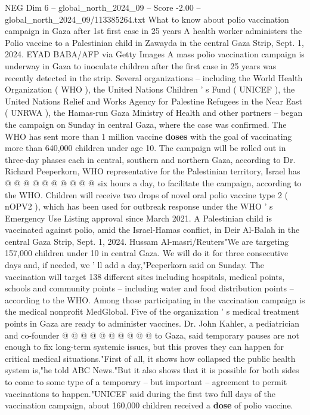 \begin{textsample}{NEG Dim 6 – global\_north\_2024\_09 – Score -2.00 – global\_north\_2024\_09/113385264.txt}  \label{ex:f6_neg_016}
What to know about polio vaccination campaign in Gaza after 1st first case in 25 years A health worker administers the Polio vaccine to a Palestinian child in Zawayda in the central Gaza Strip, Sept. 1, 2024.
EYAD BABA/AFP via Getty Images A mass polio vaccination campaign is underway in Gaza to inoculate children after the first case in 25 years was recently detected in the strip.
Several organizations -- including the World Health Organization ( WHO ), the United Nations Children ' s Fund ( UNICEF ), the United Nations Relief and Works Agency for Palestine Refugees in the Near East ( UNRWA ), the Hamas-run Gaza Ministry of Health and other partners -- began the campaign on Sunday in central Gaza, where the case was confirmed.
The WHO has sent more than 1 million vaccine \textbf{doses} with the goal of vaccinating more than 640,000 children under age 10.
The campaign will be rolled out in three-day phases each in central, southern and northern Gaza, according to Dr.
Richard Peeperkorn, WHO representative for the Palestinian territory, Israel has @ @ @ @ @ @ @ @ @ @ six hours a day, to facilitate the campaign, according to the WHO.
Children will receive two drops of novel oral polio vaccine type 2 ( nOPV2 ), which has been used for outbreak response under the WHO ' s Emergency Use Listing approval since March 2021.
A Palestinian child is vaccinated against polio, amid the Israel-Hamas conflict, in Deir Al-Balah in the central Gaza Strip, Sept. 1, 2024.
Hussam Al-masri/Reuters"We are targeting 157,000 children under 10 in central Gaza.
We will do it for three consecutive days and, if needed, we ' ll add a day,"Peeperkorn said on Sunday.
The vaccination will target 138 different sites including hospitals, medical points, schools and community points -- including water and food distribution points -- according to the WHO.
Among those participating in the vaccination campaign is the medical nonprofit MedGlobal.
Five of the organization ' s medical treatment points in Gaza are ready to administer vaccines.
Dr.
John Kahler, a pediatrician and co-founder @ @ @ @ @ @ @ @ @ @ to Gaza, said temporary pauses are not enough to fix long-term systemic issues, but this proves they can happen for critical medical situations."First of all, it shows how collapsed the public health system is,"he told ABC News."But it also shows that it is possible for both sides to come to some type of a temporary -- but important -- agreement to permit vaccinations to happen."UNICEF said during the first two full days of the vaccination campaign, about 160,000 children received a \textbf{dose} of polio vaccine.

\end{textsample}
